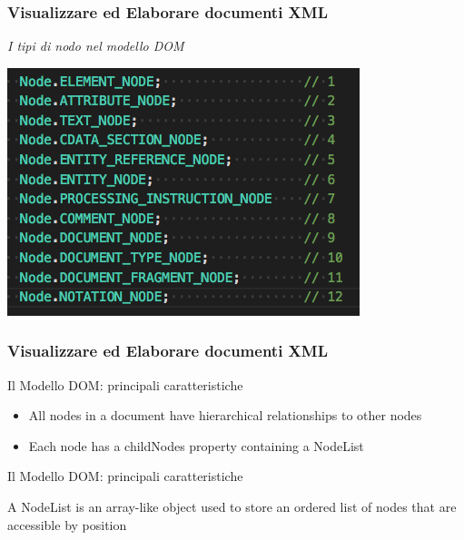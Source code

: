 \begin{frame}
    \frametitle{Visualizzare ed Elaborare documenti XML}
    \addtocounter{nframe}{1}
    

     \textit{I tipi di nodo nel modello DOM}

        \begin{center}
            \includegraphics[width=.9\textwidth]{imgs/nodetypes.png}
        \end{center}
     
\end{frame}

\begin{frame}
    \frametitle{Visualizzare ed Elaborare documenti XML}
    \addtocounter{nframe}{1}
    

     \begin{block}{Il Modello DOM: principali caratteristiche}
        \begin{itemize}
            \item All nodes in a document have hierarchical relationships to other nodes
            \item Each node has a childNodes property containing a NodeList
        \end{itemize}
     \end{block}

     \begin{block}{Il Modello DOM: principali caratteristiche}

            A NodeList is an array-like object used to store an ordered list of nodes that are accessible by position
       
     \end{block}

\end{frame}


